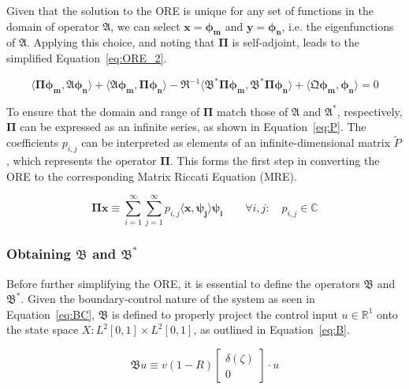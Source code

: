 Given that the solution to the ORE is unique for any set of functions in the domain of operator $\mathfrak{A}$, we can select $\bm{x} = \bm{\phi_m}$ and $\bm{y} = \bm{\phi_n}$, i.e. the eigenfunctions of $\mathfrak{A}$. Applying this choice, and noting that $\mathbf{\Pi}$ is self-adjoint, leads to the simplified Equation~\ref{eq:ORE_2}.

\begin{equation} \label{eq:ORE_2}
    \langle \mathbf{\Pi} \bm{\phi_m}, \mathfrak{A} \bm{\phi_n} \rangle
    + \langle \mathfrak{A} \bm{\phi_m}, \mathbf{\Pi} \bm{\phi_n} \rangle
    - \mathfrak{R}^{-1} \langle \mathfrak{B}^* \mathbf{\Pi} \bm{\phi_m}, \mathfrak{B}^* \mathbf{\Pi} \bm{\phi_n} \rangle 
    + \langle \mathfrak{Q} \bm{\phi_m}, \bm{\phi_n} \rangle = 0
\end{equation}

To ensure that the domain and range of $\mathbf{\Pi}$ match those of $\mathfrak{A}$ and $\mathfrak{A}^*$, respectively, $\mathbf{\Pi}$ can be expressed as an infinite series, as shown in Equation~\ref{eq:P}. The coefficients $p_{i,j}$ can be interpreted as elements of an infinite-dimensional matrix $\tilde{P}$, which represents the operator $\mathbf{\Pi}$. This forms the first step in converting the ORE to the corresponding Matrix Riccati Equation (MRE).

\begin{equation} \label{eq:P}
    \mathbf{\Pi} \bm{x} \equiv \sum_{i=1}^{\infty}\sum_{j=1}^{\infty} p_{i,j} \langle \bm{x}, \bm{\psi_j} \rangle \bm{\psi_i} \qquad
    \forall {i,j}: \quad p_{i,j} \in \mathbb{C}
\end{equation}

\subsubsection{Obtaining $\mathfrak{B}$ and $\mathfrak{B}^*$}

Before further simplifying the ORE, it is essential to define the operators $\mathfrak{B}$ and $\mathfrak{B}^*$. Given the boundary-control nature of the system as seen in Equation~\ref{eq:BC}, $\mathfrak{B}$ is defined to properly project the control input $u \in \mathbb{R}^1$ onto the state space $X: L^2[0,1] \times L^2[0,1]$, as outlined in Equation~\ref{eq:B}.

\begin{equation} \label{eq:B}
    \mathfrak{B} u \equiv v(1-R)
    \begin{bmatrix}
        \delta(\zeta) \\ 0
    \end{bmatrix} \cdot u
\end{equation}


